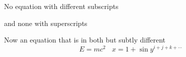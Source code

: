 \documentclass{article}
\begin{document}
No equation with different subscripts

and none with superscripts

Now an equation that is in both but subtly different
\[
E=mc^2\ \ \ \ x=1+\sin y^{i+j+k+\cdots}
\]
\end{document}
